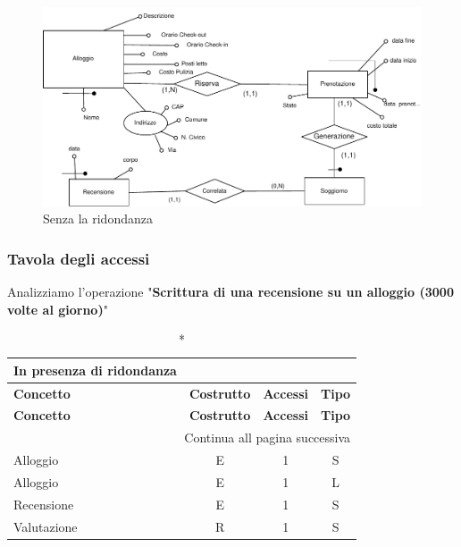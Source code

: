 \begin{figure}[H]
      \includegraphics[width=\textwidth]{resources/pdf/page6.pdf}
      \caption{Senza la ridondanza}
\end{figure}

\clearpage
\subsubsection{Tavola degli accessi}
Analizziamo l'operazione "\textbf{Scrittura di una recensione su un alloggio (3000 volte al giorno)}"

\small
\setlength\extrarowheight{2pt}
\begin{longtable}{|lccc|}
      \caption*{In presenza di ridondanza}                                             \\

      \hline \textbf{Concetto} & \textbf{Costrutto} & \textbf{Accessi} & \textbf{Tipo} \\\hline
      \endfirsthead

      \hline \textbf{Concetto} & \textbf{Costrutto} & \textbf{Accessi} & \textbf{Tipo} \\\hline
      \endhead

      \hline \multicolumn{4}{|r|}{{Continua all pagina successiva}}                    \\\hline
      \endfoot

      \hline
      \endlastfoot
      Alloggio                 & E                  & 1                & S             \\%
      Alloggio                 & E                  & 1                & L             \\%
      Recensione               & E                  & 1                & S             \\%
      Valutazione              & R                  & 1                & S             \\%
\end{longtable}
\normalsize

